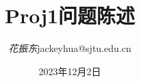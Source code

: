 \documentclass[12pt,a4paper]{ctexart}
\title{\textbf{Proj1问题陈述}} %
\author{
\begin{tabular}{ll}
  \textit{花振东} & jackeyhua@sjtu.edu.cn \\
\end{tabular}
}
\date{2023年12月2日} %
\begin{document}
\maketitle %





%
%

\pagebreak


%
%
\end{document}

